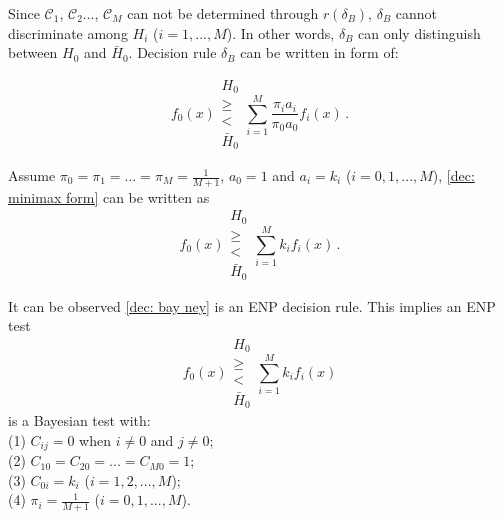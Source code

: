 Since $\mathcal{C}_1$, $\mathcal{C}_2$..., $\mathcal{C}_M$ can not be determined through $r(\delta_B)$,  $\delta_B$ cannot discriminate among $H_i$ ($ i = 1, ..., M$). In other words, $\delta_B$ can only distinguish between $H_0$ and $\bar{H}_0$.  Decision rule $\delta_B$ can be written in form of: 

\begin{equation}
\label{dec: minimax form}
f_0(x) \substack{H_0 \\ \geq \\ < \\ \bar{H}_0} \sum_{i=1}^{M}\frac{\pi_ia_i}{\pi_0a_0}f_i(x)\,.
\end{equation}

Assume $\pi_0 = \pi_1 = ... = \pi_{M} = \frac{1}{M+1}$, $a_0 = 1$ and $a_i = k_i$ ($i=0, 1, ..., M$), \eqref{dec: minimax form} can be written as
\begin{equation}
\label{dec: bay ney}
f_0(x) \substack{H_0 \\ \geq \\ < \\ \bar{H}_0} \sum_{i=1}^{M}k_if_i(x)\,. 
\end{equation}

It can be observed \eqref{dec: bay ney} is an ENP decision rule. This implies an ENP test
\[
f_0(x) \substack{H_0 \\ \geq \\ < \\ \bar{H}_0} \sum_{i=1}^{M}k_if_i(x)
\]
is a Bayesian test with:
\\(1) $C_{ij} = 0$ when $i \neq 0$ and $j \neq 0$;
\\(2) $C_{10} = C_{20} = ... = C_{M0} =1$;
\\(3) $C_{0i} = k_i$ ($i = 1, 2, ..., M$);
\\(4) $\pi_i = \frac{1}{M+1}$ ($i=0, 1, ..., M$).

